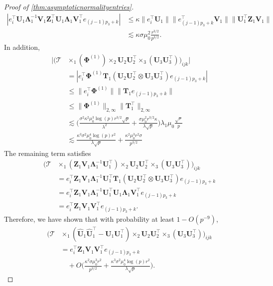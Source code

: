 \documentclass[10pt]{article}
\newcommand{\0}{{\mathbf{0}}}
\newcommand{\1}{{\mathbf{1}}}
\newcommand{\U}{{\mathbf{U}}}
\renewcommand{\t}{^{\top}}
\newcommand{\uhat}{\mathbf{\hat{U}}}
\newcommand{\inv}{^{-1}}
\renewcommand{\hat}{\widehat}
\renewcommand{\hat}{\widehat}
\begin{document}
\begin{proof}[Proof of \cref{thm:asymptoticnormalityentries}]
\begin{align*}
    | e_i\t \U_1 \mathbf{\Lambda}_1\inv \mathbf{V}_1 \mathbf{Z}_1\t \U_1 \mathbf{\Lambda}_1 \mathbf{V}_1\t e_{(j-1)p_3 + k} | &\leq \kappa \| e_i\t \U_1 \| \| e_{(j-1)p_3 + k}\t \mathbf{V}_1 \| \|\U_1 \t \mathbf{Z}_1 \mathbf{V}_1 \| \\
    &\lesssim \kappa \sigma \mu_0^2 \frac{r^{3/2}}{p^{3/2}}.
\end{align*}
In addition,
\begin{align*}
   | \bigg( \mathcal{T} &\times_1 ( \mathbf{\Phi}^{(1)}) \times_2 \U_2 \U_2\t \times_3 ( \U_3 \U_3\t)\bigg)_{ijk} |\\
   &= | e_i\t \mathbf{\Phi}^{(1)} \mathbf{T}_1 (\U_2 \U_2\t \otimes \U_3 \U_3\t) e_{(j-1)p_3 + k} | \\
   &\leq \| e_i\t \mathbf{\Phi}^{(1)} \| \| \mathbf{T}_1 e_{(j-1)p_3 + k} \| \\
   &\leq \| \mathbf{\Phi}^{(1)} \|_{2,\infty} \| \mathbf{T}_1\t \|_{2,\infty}  \\
   &\lesssim \bigg(  \frac{\sigma^2 \kappa^2 \mu_0^3 \log(p) r^{3/2} \sqrt{p}}{\lambda^2} + \frac{\sigma \mu_0^2 r^{3/2} \kappa}{\lambda \sqrt{p}}  \bigg)\lambda_1 \mu_0 \frac{\sqrt{r}}{p} \\
   &\lesssim 
   \frac{\kappa^3 \sigma^2 \mu_0^4 \log(p) r^2}{\lambda \sqrt{p}} + \frac{\kappa^2 \mu_0^3 r^2 \sigma}{ p^{3/2}}
\end{align*}
The remaining term satisfies
\begin{align*}
    \bigg( \mathcal{T} &\times_1 ( \mathbf{Z}_1 \mathbf{V}_1 \mathbf{\Lambda}_1\inv \U_1\t ) \times_2 \U_2 \U_2\t \times_3 ( \U_3 \U_3\t)\bigg)_{ijk} \\
    &= e_i\t \mathbf{Z}_1 \mathbf{V}_1 \mathbf{\Lambda}_1\inv \U_1\t \mathbf{T}_1 ( \U_2 \U_2\t \otimes \U_3 \U_3\t ) e_{(j-1)p_3 + k} \\
    &= e_i\t \mathbf{Z}_1 \mathbf{V}_1 \mathbf{\Lambda}_1\inv \U_1 \t \U_1 \mathbf{\Lambda}_1 \mathbf{V}_1\t  e_{(j-1)p_3 + k} \\
    &= e_i\t \mathbf{Z}_1 \mathbf{V}_1 \mathbf{V}_1\t  e_{(j-1)p_3 + k}.
\end{align*}
Therefore, we have shown that with probability at least $1 - O(p^{-9})$,
\begin{align*}
    \bigg( \mathcal{T}& \times_1 (\uhat_1 \uhat_1\t - \U_1\U_1\t) \times_2 \U_2 \U_2\t \times_3 ( \U_3 \U_3\t)\bigg)_{ijk} \\
    &= e_i\t \mathbf{Z}_1 \mathbf{V}_1 \mathbf{V}_1\t  e_{(j-1)p_3 + k} \\
    &\quad + O\bigg( \frac{\kappa^2 \sigma \mu_0^3 r^{2}}{p^{3/2}} + \frac{\kappa^3 \sigma^2 \mu_0^4 \log(p) r^2}{\lambda\sqrt{p}}\bigg).

\end{align*}
\end{proof}
\end{document}
